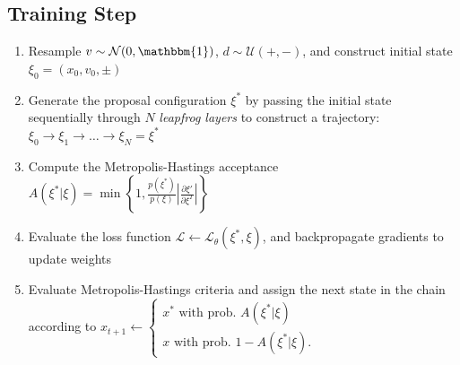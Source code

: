 \documentclass[a4paper,11pt]{article}
\begin{document}
\subsection{\label{subsec:trainstep}Training Step}
%
\begin{enumerate}
    \item Resample \(v \sim \mathcal{N} (0, \mathbbm{1})\),
        \(d \sim \mathcal{U} (+, -)\), and construct initial state
        \(\xi_{0} = (x_{0}, v_{0}, \pm)\)
    \item Generate the proposal configuration \(\xi^{\ast}\) by passing the
        initial state sequentially through \(N\) \emph{leapfrog
        layers }%
        to construct a trajectory: \(\xi_{0} \rightarrow \xi_{1} \rightarrow
        \ldots \rightarrow \xi_{N} = \xi^{\ast}\)
    \item Compute the Metropolis-Hastings acceptance \(A(\xi^{\ast} | \xi) =
        \min\left\{1, \frac{p(\xi^{\ast})}{p(\xi)}\left|\frac{\partial
        \xi'}{\partial \xi^{T}} \right| \right\}\)
    \item Evaluate the loss function \(\mathcal{L} \leftarrow
        \mathcal{L}_{\theta}(\xi^{\ast}, \xi)\), and backpropagate gradients to
        update weights
    \item Evaluate Metropolis-Hastings criteria and assign the next state in
        the chain according to
        \(x_{t+1} \leftarrow \begin{cases}%
            x^{\ast} \text{ with prob. } A(\xi^{\ast}|\xi) \\
            x \text{ with prob. } 1 - A(\xi^{\ast}|\xi).
        \end{cases}\)
\end{enumerate}
%
\end{document}
